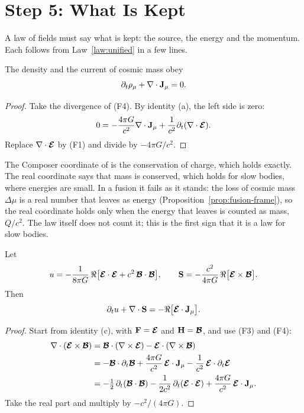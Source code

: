 \section{Step 5: What Is Kept}\label{sec:un-kept}

A law of fields must say what is kept: the source, the energy and the momentum. Each follows from Law~\ref{law:unified} in a few lines.

\begin{theorem}\label{thm:un-source}
The density and the current of cosmic mass obey
\[
\partial_t\rho_\mu + \nabla\cdot\mathbf{J}_\mu = 0 .
\]
\end{theorem}

\begin{proof}
Take the divergence of (F4). By identity (a), the left side is zero:
\[
0 = -\frac{4\pi G}{c^2}\nabla\cdot\mathbf{J}_\mu + \frac{1}{c^2}\partial_t(\nabla\cdot\boldsymbol{\mathcal{E}}) .
\]
Replace $\nabla\cdot\boldsymbol{\mathcal{E}}$ by (F1) and divide by $-4\pi G/c^2$.
\end{proof}

The Composer coordinate of  is the conservation of charge, which holds exactly. The real coordinate says that mass is conserved, which holds for slow bodies, where energies are small. In a fusion it fails as it stands: the loss of cosmic mass $\Delta\mu$ is a real number that leaves as energy (Proposition~\ref{prop:fusion-frame}), so the real coordinate holds only when the energy that leaves is counted as mass, $Q/c^2$. The law itself does not count it; this is the first sign that it is a law for slow bodies.

\begin{theorem}\label{thm:un-energy}
Let
\[
u = -\frac{1}{8\pi G}\,\Re\bigl[\boldsymbol{\mathcal{E}}\cdot\boldsymbol{\mathcal{E}} + c^2\,\boldsymbol{\mathcal{B}}\cdot\boldsymbol{\mathcal{B}}\bigr], \qquad \mathbf{S} = -\frac{c^2}{4\pi G}\,\Re\bigl[\boldsymbol{\mathcal{E}}\times\boldsymbol{\mathcal{B}}\bigr].
\]
Then
\[
\partial_t u + \nabla\cdot\mathbf{S} = -\Re\bigl[\boldsymbol{\mathcal{E}}\cdot\mathbf{J}_\mu\bigr] .
\]
\end{theorem}

\begin{proof}
Start from identity (c), with $\mathbf{F} = \boldsymbol{\mathcal{E}}$ and $\mathbf{H} = \boldsymbol{\mathcal{B}}$, and use (F3) and (F4):
\begin{align*}
\nabla\cdot(\boldsymbol{\mathcal{E}}\times\boldsymbol{\mathcal{B}}) &= \boldsymbol{\mathcal{B}}\cdot(\nabla\times\boldsymbol{\mathcal{E}}) - \boldsymbol{\mathcal{E}}\cdot(\nabla\times\boldsymbol{\mathcal{B}})\\
&= -\boldsymbol{\mathcal{B}}\cdot\partial_t\boldsymbol{\mathcal{B}} + \frac{4\pi G}{c^2}\,\boldsymbol{\mathcal{E}}\cdot\mathbf{J}_\mu - \frac{1}{c^2}\,\boldsymbol{\mathcal{E}}\cdot\partial_t\boldsymbol{\mathcal{E}}\\
&= -\tfrac12\,\partial_t(\boldsymbol{\mathcal{B}}\cdot\boldsymbol{\mathcal{B}}) - \frac{1}{2c^2}\,\partial_t(\boldsymbol{\mathcal{E}}\cdot\boldsymbol{\mathcal{E}}) + \frac{4\pi G}{c^2}\,\boldsymbol{\mathcal{E}}\cdot\mathbf{J}_\mu .
\end{align*}
Take the real part and multiply by $-c^2/(4\pi G)$.
\end{proof}

